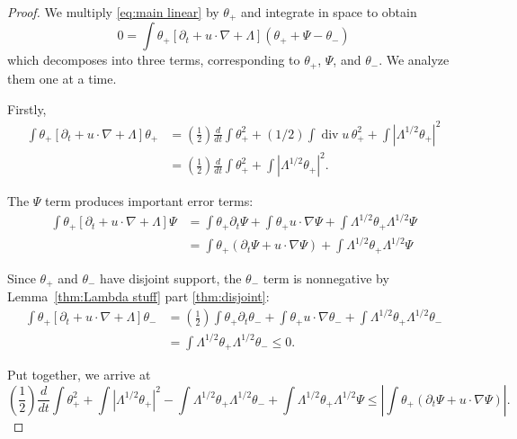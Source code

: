 \documentclass[11pt]{amsart}
\theoremstyle{remark}
\theoremstyle{definition}
\newcommand{\paren}[1]{\left( #1 \right)}
\newcommand{\bracket}[1]{\left[ #1 \right]}
\newcommand{\abs}[1]{\left\lvert #1 \right\rvert}
\newcommand{\del}{\partial}
\newcommand{\grad}{\nabla}
\newcommand{\ddt}{\frac{d}{dt}}
\renewcommand{\div}{\operatorname{div}}
\begin{document}
\begin{proof}
We multiply \eqref{eq:main linear} by $\theta_+$ and integrate in space to obtain
\[ 0 = \int \theta_+ \bracket{ \del_t + u \cdot \grad + \Lambda } \paren{\theta_+ + \Psi - \theta_-} \]
which decomposes into three terms, corresponding to $\theta_+$, $\Psi$, and $\theta_-$.  We analyze them one at a time.  

Firstly,
\begin{align*} 
\int \theta_+ \bracket{ \del_t + u \cdot \grad + \Lambda } \theta_+ &= \paren{\frac{1}{2}} \ddt \int \theta_+^2 + (1/2) \int \div u \, \theta_+^2 + \int \abs{\Lambda^{1/2} \theta_+}^2
\\ &= \paren{\frac{1}{2}} \ddt \int \theta_+^2 + \int \abs{\Lambda^{1/2} \theta_+}^2.
\end{align*}

The $\Psi$ term produces important error terms:
\begin{align*} 
\int \theta_+ \bracket{ \del_t + u \cdot \grad + \Lambda } \Psi &= \int \theta_+ \del_t \Psi + \int \theta_+ u \cdot \grad \Psi + \int \Lambda^{1/2} \theta_+ \Lambda^{1/2} \Psi
\\ &= \int \theta_+ (\del_t \Psi + u \cdot \grad \Psi) + \int \Lambda^{1/2} \theta_+ \Lambda^{1/2} \Psi
\end{align*}

Since $\theta_+$ and $\theta_-$ have disjoint support, the $\theta_-$ term is nonnegative by Lemma~\ref{thm:Lambda stuff} part \eqref{thm:disjoint}:
\begin{align*} 
\int \theta_+ \bracket{ \del_t + u \cdot \grad + \Lambda } \theta_- &= \paren{\frac{1}{2}} \int \theta_+ \del_t \theta_- + \int \theta_+ u \cdot \grad \theta_- + \int \Lambda^{1/2} \theta_+ \Lambda^{1/2} \theta_-
\\ &= \int \Lambda^{1/2} \theta_+ \Lambda^{1/2} \theta_- \leq 0.
\end{align*}

Put together, we arrive at 
\begin{equation} \label{first form of cacciopolli} \paren{\frac{1}{2}} \ddt \int \theta_+^2 + \int \abs{\Lambda^{1/2} \theta_+}^2 - \int \Lambda^{1/2}\theta_+ \Lambda^{1/2} \theta_- + \int \Lambda^{1/2} \theta_+ \Lambda^{1/2} \Psi \leq \abs{\int \theta_+ (\del_t \Psi + u \cdot \grad \Psi)}. \end{equation}


\end{proof}
\end{document}
